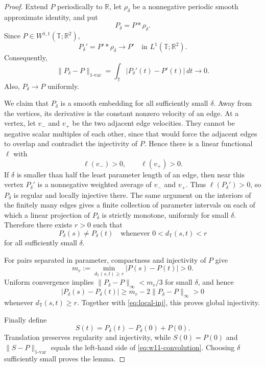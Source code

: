 \documentclass[10pt,a4paper]{amsart}
\newcommand{\R}{\mathbb{R}}
\newcommand{\T}{\mathbb{T}}
\begin{document}
\begin{proof}
Extend \(P\) periodically to \(\R\), let \(\rho_\delta\) be a nonnegative
periodic smooth approximate identity, and put
\[
 P_\delta=P*\rho_\delta.
\]
Since \(P\in W^{1,1}(\T;\R^2)\),
\[
 P_\delta' =P'*\rho_\delta\longrightarrow P'
 \quad\text{in }L^1(\T;\R^2).
\]
Consequently,
\begin{equation}\label{eq:w11-convolution}
 \lVert P_\delta-P\rVert_{1\text{-var}}
 =\int_{\T}|P_\delta'(t)-P'(t)|\,dt
 \longrightarrow0.
\end{equation}
Also, \(P_\delta\to P\) uniformly.

We claim that \(P_\delta\) is a smooth embedding for all sufficiently small
\(\delta\).  Away from the vertices, its derivative is the constant nonzero
velocity of an edge.  At a vertex, let \(v_-\) and \(v_+\) be the two adjacent
edge velocities.  They cannot be negative scalar multiples of each other,
since that would force the adjacent edges to overlap and contradict the
injectivity of \(P\).  Hence there is a linear functional \(\ell\) with
\[
 \ell(v_-)>0,
 \qquad
 \ell(v_+)>0.
\]
If \(\delta\) is smaller than half the least parameter length of an edge, then
near this vertex \(P_\delta'\) is a nonnegative weighted average of \(v_-\) and
\(v_+\).  Thus \(\ell(P_\delta')>0\), so \(P_\delta\) is regular and locally
injective there.  The same argument on the interiors of the finitely many
edges gives a finite collection of parameter intervals on each of which a
linear projection of \(P_\delta\) is strictly monotone, uniformly for small
\(\delta\).  Therefore there exists \(r>0\) such that
\begin{equation}\label{eq:local-inj}
 P_\delta(s)\neq P_\delta(t)
 \quad\text{whenever }0<d_{\T}(s,t)<r
\end{equation}
for all sufficiently small \(\delta\).

For pairs separated in parameter, compactness and injectivity of \(P\) give
\[
 m_r:=\min_{d_{\T}(s,t)\geq r}|P(s)-P(t)|>0.
\]
Uniform convergence implies
\(\lVert P_\delta-P\rVert_\infty<m_r/3\) for small \(\delta\), and hence
\[
 |P_\delta(s)-P_\delta(t)|
 \geq m_r-2\lVert P_\delta-P\rVert_\infty>0
\]
whenever \(d_{\T}(s,t)\geq r\).  Together with
\eqref{eq:local-inj}, this proves global injectivity.

Finally define
\[
 S(t)=P_\delta(t)-P_\delta(0)+P(0).
\]
Translation preserves regularity and injectivity, while \(S(0)=P(0)\) and
\(\lVert S-P\rVert_{1\text{-var}}\) equals the left-hand side of
\eqref{eq:w11-convolution}.  Choosing \(\delta\) sufficiently small proves
the lemma.
\end{proof}
\end{document}
